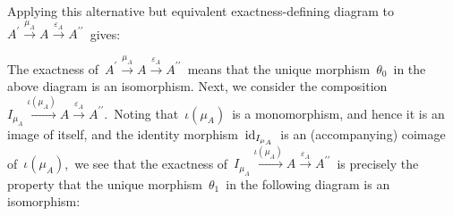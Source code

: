 \begin{enumerate}
\begin{center}
	\end{center}
	Applying this alternative but equivalent exactness-defining diagram to 
	\,$A^{\prime} \overset{\mu_{A}}{\longrightarrow} A \overset{\varepsilon_{A}}{\longrightarrow} A^{\prime\prime}$\,
	gives:	
	\begin{center}
	\end{center}
	The exactness of
	\,$A^{\prime} \overset{\mu_{A}}{\longrightarrow} A \overset{\varepsilon_{A}}{\longrightarrow} A^{\prime\prime}$\,
	means that the unique morphism \,$\theta_{0}$\, in the above diagram is an isomorphism.
	Next, we consider the composition
	\,$I_{\mu_{A}} \overset{\iota(\mu_{A})}{\longrightarrow} A \overset{\varepsilon_{A}}{\longrightarrow} A^{\prime\prime}$.\,
	Noting that \,$\iota(\mu_{A})$\, is a monomorphism, and hence it is an image of itself,
	and the identity morphism \,$\textnormal{id}_{I_{\mu_{A}}}$\, is an (accompanying) coimage of \,$\iota(\mu_{A})$,\,
	we see that the exactness of
	\,$I_{\mu_{A}} \overset{\iota(\mu_{A})}{\longrightarrow} A \overset{\varepsilon_{A}}{\longrightarrow} A^{\prime\prime}$\,
	is precisely the property that the unique morphism \,$\theta_{1}$\, in the following diagram is an isomorphism:

\end{enumerate}
